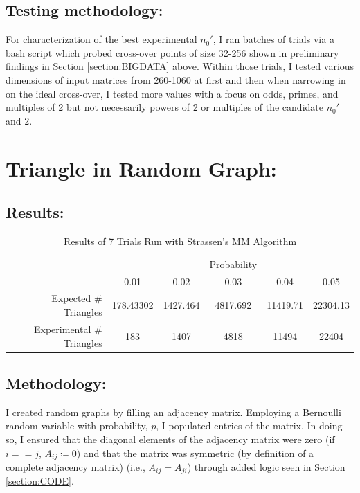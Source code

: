 \documentclass[conference]{styles/acmsiggraph}
\newcommand{\?}{\stackrel{?}{=}}
\begin{document}
\subsection{Testing methodology:}
For characterization of the best experimental $n_0'$, I ran batches of trials via a bash script which probed cross-over points of size 32-256 shown in preliminary findings in Section \ref{section:BIGDATA} above.  Within those trials, I tested various dimensions of input matrices from 260-1060 at first and then when narrowing in on the ideal cross-over, I tested more values with a focus on odds, primes, and multiples of 2 but not necessarily powers of 2 or multiples of the candidate $n_0'$ and 2.

\section{Triangle in Random Graph:} \label{section:Triangles}
\subsection{Results:}

\begin{table}[htbp]
    \centering
    \begin{tabular}{rccccc}
          &       &       & Probability &       &  \\
        \cmidrule{2-6}          & 0.01  & 0.02  & 0.03  & 0.04  & 0.05 \\
        \cmidrule{2-6}    Expected \# Triangles & 178.43302 & 1427.464 & 4817.692 & 11419.71 & 22304.13 \\
    Experimental \# Triangles & 183   & 1407  & 4818  & 11494 & 22404 \\
        \cmidrule{2-6}    \end{tabular}%
  \label{tab:triangles}%
\caption{Results of 7 Trials Run with Strassen's MM Algorithm}
\end{table}%

\subsection{Methodology:}
I created random graphs by filling an adjacency matrix.  Employing a Bernoulli random variable with probability, $p$, I populated entries of the matrix.  In doing so, I ensured that the diagonal elements of the adjacency matrix were zero (if $i == j$, $A_{ij}\coloneq 0$) and that the matrix was symmetric (by definition of a complete adjacency matrix) (i.e., $A_{ij} = A_{ji}$) through added logic seen in Section \ref{section:CODE}. \\
\end{document}
